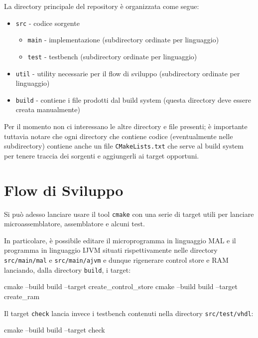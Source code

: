 \documentclass[a4paper,12pt]{scrreprt}
\begin{document}
La directory principale del repository è organizzata come segue:
\begin{itemize}
  \item \lstinline{src} - codice sorgente
  \begin{itemize}
    \item \lstinline{main} - implementazione (subdirectory ordinate per
    linguaggio)
    \item \lstinline{test} - testbench (subdirectory ordinate per linguaggio)
  \end{itemize}
  \item \lstinline{util} - utility necessarie per il flow di sviluppo
  (subdirectory ordinate per linguaggio)
  \item \lstinline{build} - contiene i file prodotti dal build system (questa
  directory deve essere creata manualmente)
\end{itemize}

Per il momento non ci interessano le altre directory e file presenti; è
importante tuttavia notare che ogni directory che contiene codice (eventualmente
nelle subdirectory) contiene anche un file \lstinline{CMakeLists.txt} che serve
al build system per tenere traccia dei sorgenti e aggiungerli ai target
opportuni.

\section{Flow di Sviluppo}

Si può adesso lanciare usare il tool \lstinline{cmake} con una serie
di target utili per lanciare microassemblatore, assemblatore e alcuni
test.

In particolare, è possibile editare il microprogramma in linguaggio
MAL e il programma in linguaggio IJVM situati rispettivamente nelle
directory \lstinline{src/main/mal} e \lstinline{src/main/ajvm} e
dunque rigenerare control store e RAM lanciando, dalla directory
\lstinline{build}, i target:

\begin{commandshell}
  cmake --build build --target create_control_store
  cmake --build build --target create_ram
\end{commandshell}

Il target \lstinline{check} lancia invece i testbench contenuti nella directory
\lstinline{src/test/vhdl}:
\begin{commandshell}
  cmake --build build --target check
\end{commandshell}
\end{document}
